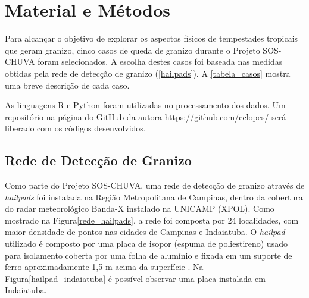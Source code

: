 \chapter{Material e Métodos}\label{database}

Para alcançar o objetivo de explorar os aspectos físicos de tempestades tropicais que geram granizo, cinco casos de queda de granizo durante o Projeto SOS-CHUVA foram selecionados. A escolha destes casos foi baseada nas medidas obtidas pela rede de detecção de granizo (\autoref{hailpads}). A \autoref{tabela_casos} mostra uma breve descrição de cada caso.



As linguagens R \cite{RCoreTeam2018a} e Python \cite{PythonCoreTeam2018} foram utilizadas no processamento dos dados. Um repositório na página do GitHub da autora \url{https://github.com/cclopes/} será liberado com os códigos desenvolvidos.

\section{Rede de Detecção de Granizo}\label{hailpads}

Como parte do Projeto SOS-CHUVA, uma rede de detecção de granizo através de \textit{hailpads} foi instalada na Região Metropolitana de Campinas, dentro da cobertura do radar meteorológico Banda-X instalado na UNICAMP (XPOL). Como mostrado na Figura\autoref{rede_hailpads}, a rede foi composta por 24 localidades, com maior densidade de pontos nas cidades de Campinas e Indaiatuba. O \textit{hailpad} utilizado é composto por uma placa de isopor (espuma de poliestireno) usado para isolamento coberta por uma folha de alumínio e fixada em um suporte de ferro aproximadamente 1,5 m acima da superfície \cite{ThomazJunior2016}. Na Figura\autoref{hailpad_indaiatuba} é possível observar uma placa instalada em Indaiatuba.

